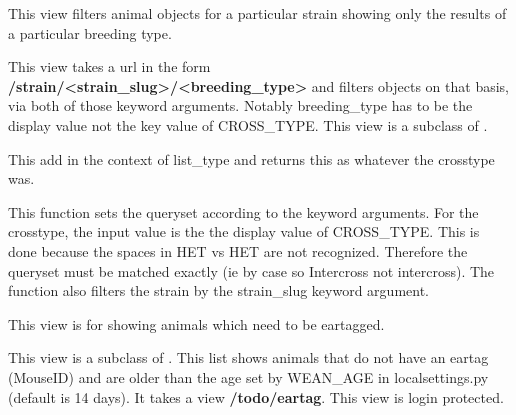 \documentclass[letterpaper,10pt,english]{sphinxmanual}
\begin{document}
\begin{fulllineitems}
\label{animals:mousedb.animal.views.CrossTypeAnimalList}
This view filters animal objects for a particular strain showing only the results of a particular breeding type.

This view takes a url in the form \textbf{/strain/\textless{}strain\_slug\textgreater{}/\textless{}breeding\_type\textgreater{}} and filters {\hyperref[animals:mousedb.animal.models.Animal]{}} objects on that basis, via both of those keyword arguments.
Notably breeding\_type has to be the display value not the key value of CROSS\_TYPE.
This view is a subclass of .

\begin{fulllineitems}
\label{animals:mousedb.animal.views.CrossTypeAnimalList.get_context_data}
This add in the context of list\_type and returns this as whatever the crosstype was.

\end{fulllineitems}


\begin{fulllineitems}
\label{animals:mousedb.animal.views.CrossTypeAnimalList.queryset}
This function sets the queryset according to the keyword arguments.
For the crosstype, the input value is the the display value of CROSS\_TYPE.
This is done because the spaces in HET vs HET are not recognized.  
Therefore the queryset must be matched exactly (ie by case so Intercross not intercross). 
The function also filters the strain by the strain\_slug keyword argument.

\end{fulllineitems}


\end{fulllineitems}


\begin{fulllineitems}
\label{animals:mousedb.animal.views.EarTagList}
This view is for showing animals which need to be eartagged.

This view is a subclass of {\hyperref[animals:mousedb.animal.views.AnimalList]{}}.  
This list shows animals that do not have an eartag (MouseID) and are older than the age set by WEAN\_AGE in localsettings.py (default is 14 days).
It takes a view \textbf{/todo/eartag}.
This view is login protected.

\end{fulllineitems}
\end{document}
